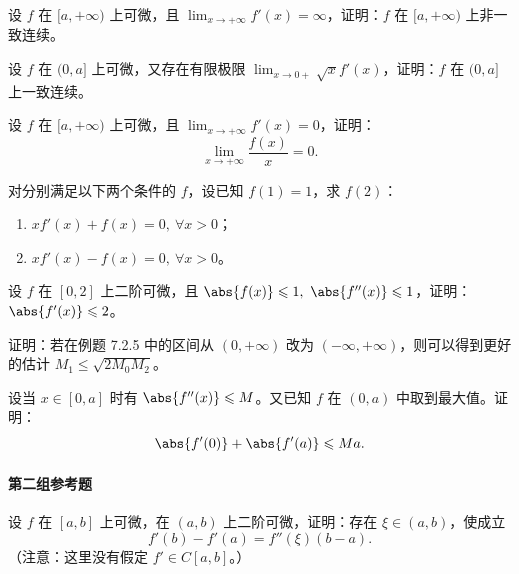 \begin{xreferenceproblem}[12]
设 $f$ 在 $[a,+\infty)$ 上可微，且 $\lim_{x\to+\infty}f'(x)=\infty$，证明：$f$ 在 $[a,+\infty)$ 上非一致连续。
\end{xreferenceproblem}

\begin{xreferenceproblem}[13]
设 $f$ 在 $(0,a]$ 上可微，又存在有限极限 $\lim_{x\to0+}\sqrt{x}f'(x)$，证明：$f$ 在 $(0,a]$ 上一致连续。
\end{xreferenceproblem}

\begin{xreferenceproblem}[14]
设 $f$ 在 $[a,+\infty)$ 上可微，且 $\lim_{x\to+\infty}f'(x)=0$，证明：
\[
  \lim_{x\to+\infty}\frac{f(x)}{x}=0.
\]
\end{xreferenceproblem}

\begin{xreferenceproblem}[15]
对分别满足以下两个条件的 $f$，设已知 $f(1)=1$，求 $f(2)$：
\begin{enumerate}[label=(\arabic*)]
  \item $xf'(x)+f(x)=0,\ \forall x>0$；
  \item $xf'(x)-f(x)=0,\ \forall x>0$。
\end{enumerate}
\end{xreferenceproblem}

\begin{xreferenceproblem}[16]
设 $f$ 在 $[0,2]$ 上二阶可微，且 $\abs{f(x)}\leqslant1,\ \abs{f''(x)}\leqslant1$，证明：$\abs{f'(x)}\leqslant2$。
\end{xreferenceproblem}

\begin{xreferenceproblem}[17]
证明：若在例题 7.2.5 中的区间从 $(0,+\infty)$ 改为 $(-\infty,+\infty)$，则可以得到更好的估计 $M_1\leqslant\sqrt{2M_0M_2}$。
\end{xreferenceproblem}

\begin{xreferenceproblem}[18]
设当 $x\in[0,a]$ 时有 $\abs{f''(x)}\leqslant M$。又已知 $f$ 在 $(0,a)$ 中取到最大值。证明：
\[
  \abs{f'(0)}+\abs{f'(a)}\leqslant Ma.
\]
\end{xreferenceproblem}

\paragraph{第二组参考题}

\begin{xreferenceproblem}[1]
设 $f$ 在 $[a,b]$ 上可微，在 $(a,b)$ 上二阶可微，证明：存在 $\xi\in(a,b)$，使成立
\[
  f'(b)-f'(a)=f''(\xi)(b-a).
\]
（注意：这里没有假定 $f'\in C[a,b]$。）
\end{xreferenceproblem}

